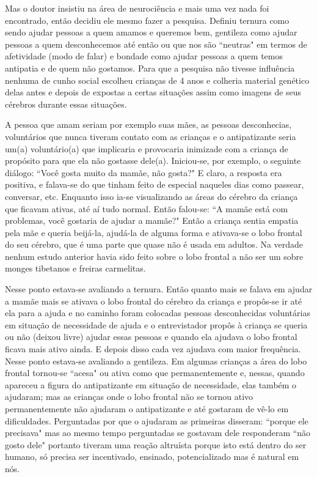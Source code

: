 \emdash{}Mas o doutor insistiu na área de neurociência e mais uma vez nada foi encontrado, então decidiu ele mesmo fazer a pesquisa. Definiu ternura como sendo ajudar pessoas a quem amamos e queremos bem, gentileza como ajudar pessoas a quem desconhecemos até então ou que nos são ``neutras" em termos de afetividade (modo de falar) e bondade como ajudar pessoas a quem temos antipatia e de quem não gostamos. Para que a pesquisa não tivesse influência nenhuma de cunho social escolheu crianças de 4 anos e colheria material genético delas antes e depois de expostas a certas situações assim como imagens de seus cérebros durante essas situações.

\emdash{}A pessoa que amam seriam por exemplo suas mães, as pessoas desconhecias, voluntários que nunca tiveram contato com as crianças e o antipatizante seria um(a) voluntário(a) que implicaria e provocaria inimizade com a criança de propósito para que ela não gostasse dele(a). Iniciou-se, por exemplo, o seguinte diálogo: ``Você gosta muito da mamãe, não gosta?" E claro, a resposta era positiva, e falava-se do que tinham feito de especial naqueles dias como passear, conversar, etc. Enquanto isso ia-se visualizando as áreas do cérebro da criança que ficavam ativas, até aí tudo normal. Então falou-se: ``A mamãe está com problemas, você gostaria de ajudar a mamãe?" Então a criança sentia empatia pela mãe e queria beijá-la, ajudá-la de alguma forma e ativava-se o lobo frontal do seu cérebro, que é uma parte que quase não é usada em adultos. Na verdade nenhum estudo anterior havia sido feito sobre o lobo frontal a não ser um sobre monges tibetanos e freiras carmelitas.

\emdash{}Nesse ponto estava-se avaliando a ternura. Então quanto mais se falava em ajudar a mamãe mais se ativava o lobo frontal do cérebro da criança e propôs-se ir até ela para a ajuda e no caminho foram colocadas pessoas desconhecidas voluntárias em situação de necessidade de ajuda e o entrevistador propôs à criança se queria ou não (deixou livre) ajudar essas pessoas e quando ela ajudava o lobo frontal ficava mais ativo ainda. E depois disso cada vez ajudava com maior frequência. Nesse ponto estava-se avaliando a gentileza. Em algumas crianças a área do lobo frontal tornou-se ``acesa" ou ativa como que permanentemente e, nessas, quando apareceu a figura do antipatizante em situação de necessidade, elas também o ajudaram; mas as crianças onde o lobo frontal não se tornou ativo permanentemente não ajudaram o antipatizante e até gostaram de vê-lo em dificuldades. Perguntadas por que o ajudaram as primeiras disseram: ``porque ele precisava" mas ao mesmo tempo perguntadas se gostavam dele responderam ``não gosto dele" portanto tiveram uma reação altruísta porque isto está dentro do ser humano, só precisa ser incentivado, ensinado, potencializado mas é natural em nós.

